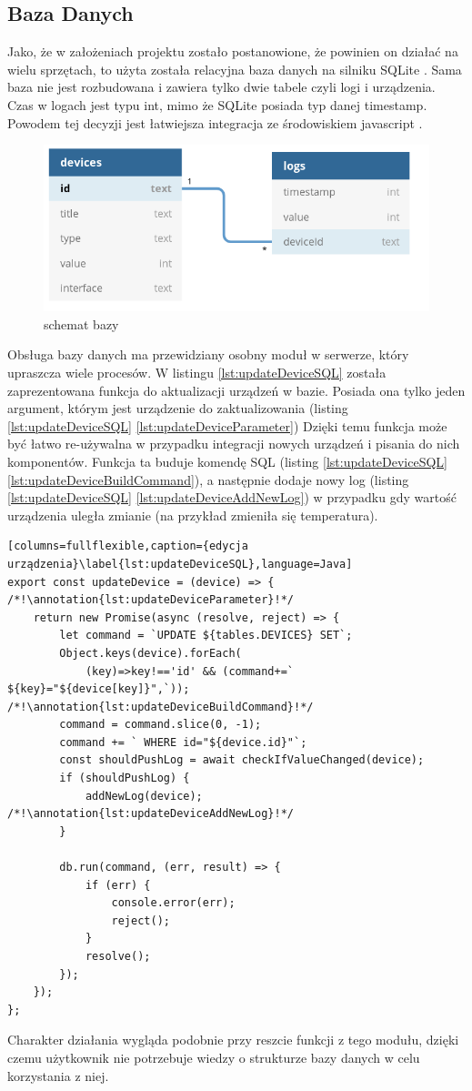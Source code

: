 \subsection{Baza Danych}
Jako, że w założeniach projektu zostało postanowione, że powinien on działać na wielu sprzętach, to użyta została relacyjna baza danych na silniku SQLite \cite{sqlite}. Sama baza nie jest rozbudowana i zawiera tylko dwie tabele czyli logi i urządzenia. Czas w logach jest typu int, mimo że SQLite posiada typ danej timestamp. Powodem tej decyzji jest łatwiejsza integracja ze środowiskiem javascript \cite{sqlitejs}.
\begin{figure}[h!]
  \includegraphics[width=\linewidth]{db.png}
  \caption{schemat bazy}
  \label{fig:db}
\end{figure}

Obsługa bazy danych ma przewidziany osobny moduł w serwerze, który upraszcza wiele procesów. W listingu \ref{lst:updateDeviceSQL} została zaprezentowana funkcja do aktualizacji urządzeń w bazie. Posiada ona tylko jeden argument, którym jest urządzenie do zaktualizowania (listing \ref{lst:updateDeviceSQL} \ref{lst:updateDeviceParameter}) Dzięki temu funkcja może być łatwo re-używalna w przypadku integracji nowych urządzeń i pisania do nich komponentów. Funkcja ta buduje komendę SQL (listing \ref{lst:updateDeviceSQL} \ref{lst:updateDeviceBuildCommand}), a następnie dodaje nowy log (listing \ref{lst:updateDeviceSQL} \ref{lst:updateDeviceAddNewLog})  w przypadku gdy wartość urządzenia uległa zmianie (na przykład zmieniła się temperatura).
\newpage
\begin{lstlisting}[columns=fullflexible,caption={edycja urządzenia}\label{lst:updateDeviceSQL},language=Java]
export const updateDevice = (device) => { /*!\annotation{lst:updateDeviceParameter}!*/
	return new Promise(async (resolve, reject) => {
		let command = `UPDATE ${tables.DEVICES} SET`;
		Object.keys(device).forEach(
		    (key)=>key!=='id' && (command+=` ${key}="${device[key]}",`)); /*!\annotation{lst:updateDeviceBuildCommand}!*/
		command = command.slice(0, -1);
		command += ` WHERE id="${device.id}"`;
		const shouldPushLog = await checkIfValueChanged(device);
		if (shouldPushLog) {
			addNewLog(device); /*!\annotation{lst:updateDeviceAddNewLog}!*/
		}

		db.run(command, (err, result) => {
			if (err) {
				console.error(err);
				reject();
			}
			resolve();
		});
	});
};
\end{lstlisting}
Charakter działania wygląda podobnie przy reszcie funkcji z tego modułu, dzięki czemu użytkownik nie potrzebuje wiedzy o strukturze bazy danych w celu korzystania z niej. 

